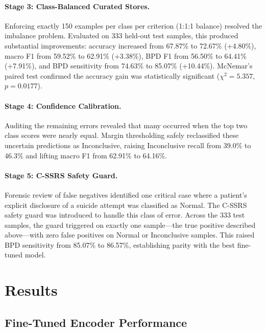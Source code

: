 \documentclass[11pt]{article}
\begin{document}
\paragraph{Stage 3: Class-Balanced Curated Stores.}
Enforcing exactly 150 examples per class per criterion (1:1:1 balance) resolved the imbalance
problem. Evaluated on 333 held-out test samples, this produced substantial improvements:
accuracy increased from 67.87\% to 72.67\% (+4.80\%), macro F1 from 59.52\% to 62.91\%
(+3.38\%), BPD F1 from 56.50\% to 64.41\% (+7.91\%), and BPD sensitivity from 74.63\% to
85.07\% (+10.44\%). McNemar's paired test confirmed the accuracy gain was statistically
significant ($\chi^2 = 5.357$, $p = 0.0177$).

\paragraph{Stage 4: Confidence Calibration.}
Auditing the remaining errors revealed that many occurred when the top two class scores were
nearly equal. Margin thresholding safely reclassified these uncertain predictions as
Inconclusive, raising Inconclusive recall from 39.0\% to 46.3\% and lifting macro F1 from
62.91\% to 64.16\%.

\paragraph{Stage 5: C-SSRS Safety Guard.}
Forensic review of false negatives identified one critical case where a patient's explicit
disclosure of a suicide attempt was classified as Normal. The C-SSRS safety guard was introduced
to handle this class of error. Across the 333 test samples, the guard triggered on exactly one
sample---the true positive described above---with zero false positives on Normal or Inconclusive
samples. This raised BPD sensitivity from 85.07\% to 86.57\%, establishing parity with the best
fine-tuned model.

\section{Results}\label{sec:results}

\subsection{Fine-Tuned Encoder Performance}
\end{document}
